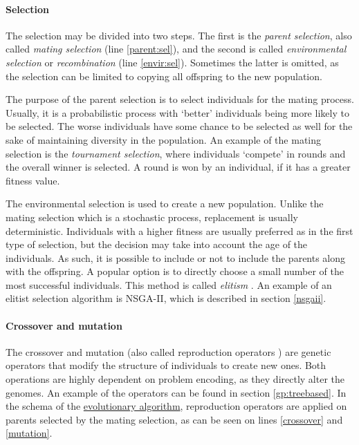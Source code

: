 \paragraph{Selection}
The selection may be divided into two steps. The first is the 
\emph{parent selection}, also called \emph{mating selection}
(line \ref{parent:sel}), and the second is called
\emph{environmental selection} or \emph{recombination} (line \ref{envir:sel}).
Sometimes the latter is omitted, as the selection can be limited to copying 
all offspring to the new population.

The purpose of the parent selection is to select individuals for the
mating process. Usually, it is a probabilistic process with `better'
individuals being more likely to be selected. The worse individuals have some
chance to be selected as well for the sake of maintaining diversity in the
population. An example of the mating selection is the
\emph{tournament selection}, where individuals `compete' in rounds and the
overall winner is selected. A round is won by an individual, if it has a 
greater fitness value.

The environmental selection is used to create a new 
population. Unlike the mating selection which is a stochastic process,
replacement is usually deterministic. Individuals with a higher fitness are
usually preferred as in the first type of selection, but the decision may take 
into account the age of the individuals. As such, it is possible to include 
or not to include the parents along with the offspring. A popular option is to 
directly choose a small number of the most successful individuals. This method 
is called \emph{elitism} \citep{Eiben:2015:IEC:2810085}.
An example of an elitist selection algorithm is NSGA-II, which
is described in section \ref{nsgaii}.

\paragraph{Crossover and mutation}
The crossover and mutation (also called reproduction operators
\citep{Engelbrecht:2007:CII:1557464}) are genetic operators that modify the
structure of individuals to create new ones. Both operations are highly
dependent on problem encoding, as they directly alter the genomes. An example
of the operators can be found in section \ref{gp:treebased}. In the schema 
of the \hyperref[alg:EA]{evolutionary algorithm}, reproduction operators
are applied on parents selected by the mating selection, as can be seen on 
lines \ref{crossover} and \ref{mutation}.

